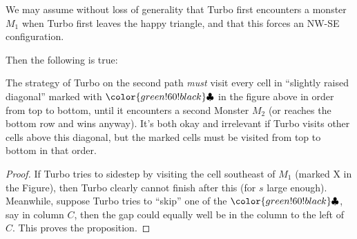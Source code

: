 \documentclass[11pt]{scrartcl}
\begin{document}
We may assume without loss of generality that Turbo first encounters a monster $M_1$
when Turbo first leaves the happy triangle, and that this forces an NW-SE configuration.

\begin{center}
\end{center}

Then the following is true:
\begin{proposition*}
  The strategy of Turbo on the second path \emph{must}
  visit every cell in ``slightly raised diagonal'' marked with
  $\color{green!60!black}\clubsuit$ in the figure above
  in order from top to bottom, until it encounters a second Monster $M_2$
  (or reaches the bottom row and wins anyway).
  It's both okay and irrelevant if Turbo visits other cells above this diagonal,
  but the marked cells must be visited from top to bottom in that order.
\end{proposition*}
\begin{proof}
  If Turbo tries to sidestep by visiting the cell southeast of $M_1$
  (marked {\color{brown}X} in the Figure),
  then Turbo clearly cannot finish after this (for $s$ large enough).
  Meanwhile, suppose Turbo tries to ``skip'' one of the $\color{green!60!black}\clubsuit$,
  say in column $C$, then the gap could equally well be in the column to the left of $C$.
  This proves the proposition.
\end{proof}
\end{document}
